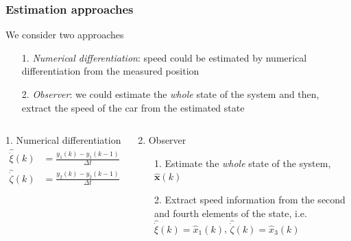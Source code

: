 \begin{frame}
    \frametitle{Estimation approaches}
    We consider two approaches\vspace{1em}
    \begin{itemize}\setlength\itemsep{0.5em}
        \item [1.] \emph{Numerical differentiation}: speed could be estimated by numerical differentiation from the measured position
        \item [2.] \emph{Observer}: we could estimate the \emph{whole} state of the system and then, extract the speed of the car from the estimated state
    \end{itemize}

     \begin{columns}[t]
        \begin{block}{1. Numerical differentiation}
            \vspace*{-1em}
            \begin{align*}
            \hat{\dot{\xi}}(k)& = \frac{y_1(k) - y_1(k-1)}{\Delta t}\\
            \hat{\dot{\zeta}}(k)& = \frac{y_2(k) - y_2(k-1)}{\Delta t}
            \end{align*}
        \end{block}
        \begin{block}{2. Observer}
        	\begin{enumerate}
        		\item [1.] Estimate the \emph{whole} state of the system, $\hat{\bm{x}}(k)$
        	
            	\item [2.] Extract speed information from the second and fourth elements of the state, i.e. 
            	$\hat{\dot{\xi}}(k)= \hat{x}_1(k)$, 
            	 $\hat{\dot{\zeta}}(k)=\hat{x}_3(k)$
        	\end{enumerate}
        \end{block}	
    \end{columns} 
\end{frame}

